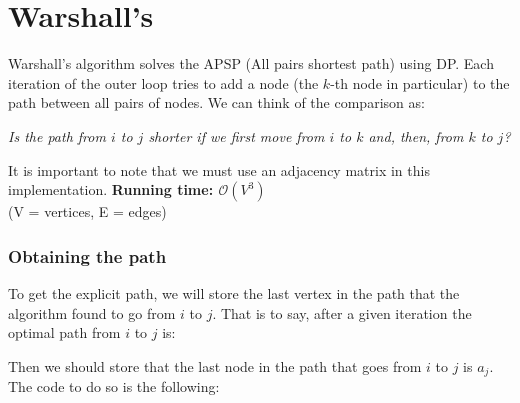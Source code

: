 \documentclass[12pt]{report}
\begin{document}
\section{Warshall's}
Warshall's algorithm solves the APSP (All pairs shortest path) using DP.
Each iteration of the outer loop tries to add a node (the $k$-th node in
particular) to the path between all pairs of nodes. 
We can think of the comparison as: 
\begin{center}
		\textit{ Is the path from $i$ to $j$ shorter if we first 
		move from $i$ to $k$ and, then, from $k$ to $j$? }
\end{center}
It is important to note that we must use an adjacency matrix in this
implementation.
\noindent \textbf{\boldmath Running time: $\mathcal{O}(V^3)$}
\\ {\small (V = vertices, E = edges)}
\subsubsection*{Obtaining the path}
To get the explicit path, we will store the last vertex in the 
path that the algorithm found to go from $i$ to $j$. That is to say,
after  a given iteration the optimal path from $i$ to $j$ is:
\begin{figure}[h!]
		\centering
{}
\end{figure}
Then we should store that the last node in the path that goes from $i$
to $j$ is $a_j$. 
The code to do so is the following:
\newpage
\end{document}
